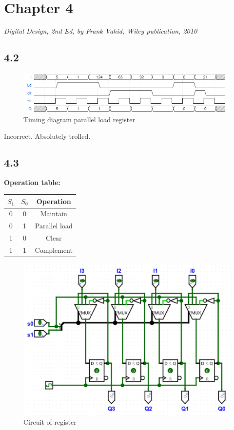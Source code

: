 \documentclass{article}
\begin{document}
\section*{Chapter 4}
\textit{Digital Design, 2nd Ed, by Frank Vahid, Wiley publication, 2010}

\subsection*{4.2}
\begin{figure}[H]
    \centering
    \includegraphics[width=\linewidth]{./images/4.2.png}
    \caption*{Timing diagram parallel load register}
\end{figure}

\textcolor{myred}{Incorrect. Absolutely trolled.}

\subsection*{4.3}
\textbf{Operation table:} \newline
\begin{tabular}{c c | c}
    $S_1$ & $S_0$ & Operation \\
    \hline
    0 & 0 & Maintain \\
    0 & 1 & Parallel load \\
    1 & 0 & Clear \\
    1 & 1 & Complement \\
\end{tabular}

\begin{figure}[H]
    \centering
    \includegraphics[width=0.7\linewidth]{./images/4.3.png}
    \caption*{Circuit of register}
\end{figure}
\end{document}
